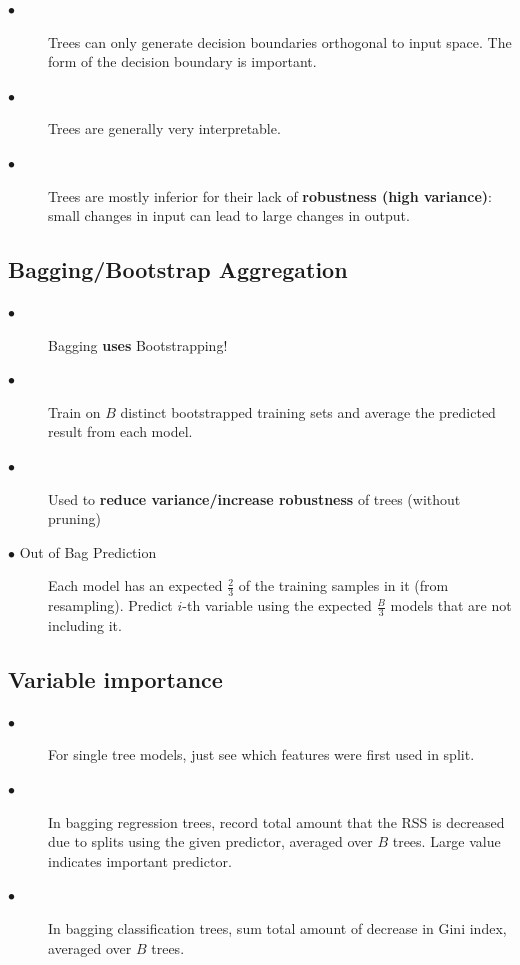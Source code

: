 \documentclass{article}
\begin{document}
\begin{description}

  \item[$\bullet$] Trees can only generate decision boundaries orthogonal to input space. The form of the decision boundary is important.
    \item[$\bullet$] Trees are generally very interpretable.
    \item[$\bullet$] Trees are mostly inferior for their lack of \textbf{robustness (high variance)}: small changes in input can lead to large changes in output.

\end{description}

\subsection{Bagging/Bootstrap Aggregation}

\begin{description}

    \item[$\bullet$] Bagging \textbf{uses} Bootstrapping! 
  
    \item[$\bullet$] Train on $B$ distinct bootstrapped training sets and average the predicted result from each model. 
    
     \item[$\bullet$] Used to \textbf{reduce variance/increase robustness} of trees (without pruning)
     
     \item[$\bullet$ Out of Bag Prediction] Each model has an expected $\frac{2}{3}$ of the training samples in it (from resampling). Predict $i$-th variable using the expected $\frac{B}{3}$ models that are not including it.
\end{description}

\subsection{Variable importance}

\begin{description}


      \item[$\bullet$] For single tree models, just see which features were first used in split.
      
      \item[$\bullet$] In bagging regression trees, record total amount that the RSS is decreased due to splits using the given predictor, averaged over $B$ trees. Large value indicates important predictor.
      
      \item[$\bullet$] In bagging classification trees, sum total amount of decrease in Gini index, averaged over $B$ trees.

\end{description}
\end{document}
